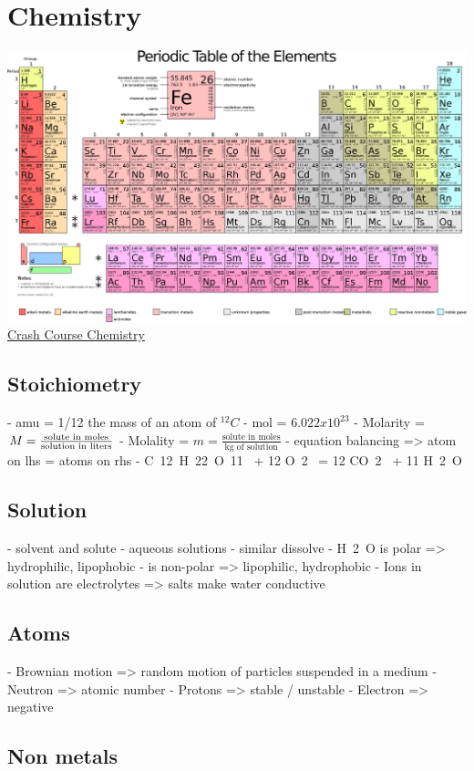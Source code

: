 \section{Chemistry}

\includegraphics[width=\textwidth]{./chemistry/imgs/ptoe.png}
\href{https://www.youtube.com/watch?v=FSyAehMdpyI}{Crash Course Chemistry}

\subsection{Stoichiometry}
- amu = 1/12 the mass of an atom of $^{12}C$
- mol =  $6.022 x 10^{23}$
- Molarity = $M = \frac{\text{solute in moles}}{\text{solution\space in\space liters}}$
- Molality = $m = \frac{\text{solute in moles}}{\text{kg of solution}}$
- equation balancing => atom on lhs = atoms on rhs
- C~12~H~22~O~11~ + 12 O~2~ = 12 CO~2~ + 11 H~2~O

\subsection{Solution}
- solvent and solute
- aqueous solutions
- similar dissolve
-  H~2~O is polar => hydrophilic, lipophobic
-  is non-polar => lipophilic, hydrophobic
- Ions in solution are electrolytes => salts make water conductive

\subsection{Atoms}
- Brownian motion => random motion of particles suspended in a medium
- Neutron => atomic number
- Protons => stable / unstable
- Electron => negative

\subsection{Non metals}


